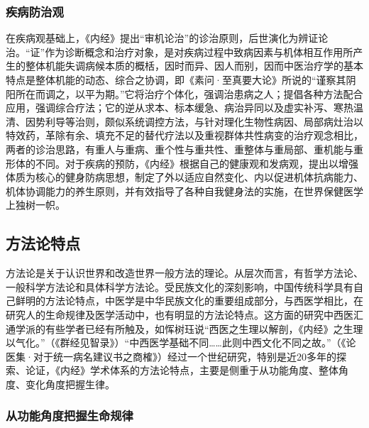 \documentclass[draft,12pt]{ctexbook}
\begin{document}
\subsubsection{疾病防治观}%

在疾病观基础上，《内经》提出“审机论治”的诊治原则，后世演化为辨证论治。“证”作为诊断概念和治疗对象，是对疾病过程中致病因素与机体相互作用所产生的整体机能失调病候本质的概栝，因时而异、因人而别，因而中医治疗学的基本特点是整体机能的动态、综合之协调，即《素问·至真要大论》所说的“谨察其阴阳所在而调之，以平为期。”它将治疗个体化，强调治患病之人；提倡各种方法配合应用，强调综合疗法；它的逆从求本、标本缓急、病治异同以及虚实补泻、寒热温清、因势利导等治则，颇似系统调控方法，与针对理化生物性病因、局部病灶治以特效药，革除有余、填充不足的替代疗法以及重视群体共性病变的治疗观念相比，两者的诊治思路，有重人与重病、重个性与重共性、重整体与重局部、重机能与重形体的不同。对于疾病的预防，《内经》根据自己的健康观和发病观，提出以增强体质为核心的健身防病思想，制定了外以适应自然变化、内以促进机体抗病能力、机体协调能力的养生原则，并有效指导了各种自我健身法的实施，在世界保健医学上独树一帜。

\subsection{方法论特点} %

方法论是关于认识世界和改造世界一般方法的理论。从层次而言，有哲学方法论、一般科学方法论和具体科学方法论。受民族文化的深刻影响，中国传统科学具有自己鲜明的方法论特点，中医学是中华民族文化的重要组成部分，与西医学相比，在研究人的生命规律及医学活动中，也有明显的方法论特点。这方面的研究中西医汇通学派的有些学者已经有所触及，如恽树珏说“西医之生理以解剖，《内经》之生理以气化。”（《群经见智录》）“中西医学基础不同……此则中西文化不同之故。”（《论医集·对于统一病名建议书之商榷》）经过一个世纪研究，特别是近20多年的探索、论证，《内经》学术体系的方法论特点，主要是侧重于从功能角度、整体角度、变化角度把握生律。

\subsubsection{从功能角度把握生命规律}%
\end{document}
